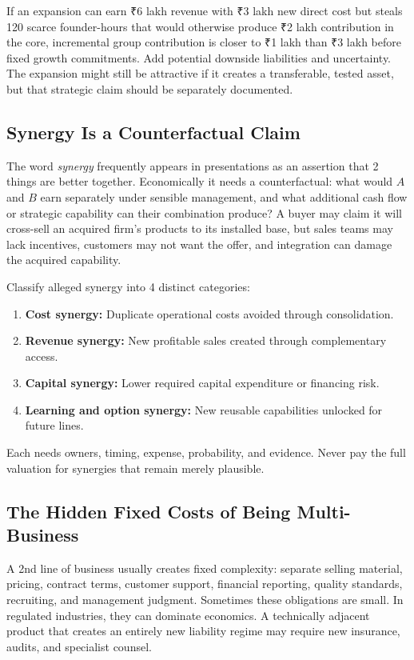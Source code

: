 If an expansion can earn ₹6 lakh revenue with ₹3 lakh new direct cost but steals 120 scarce founder-hours that would otherwise produce ₹2 lakh contribution in the core, incremental group contribution is closer to ₹1 lakh than ₹3 lakh before fixed growth commitments. Add potential downside liabilities and uncertainty. The expansion might still be attractive if it creates a transferable, tested asset, but that strategic claim should be separately documented.

\subsection{Synergy Is a Counterfactual Claim}
\label{sec:synergy_counterfactual_claim}

The word \textit{synergy} frequently appears in presentations as an assertion that 2 things are better together. Economically it needs a counterfactual: what would $A$ and $B$ earn separately under sensible management, and what additional cash flow or strategic capability can their combination produce? A buyer may claim it will cross-sell an acquired firm's products to its installed base, but sales teams may lack incentives, customers may not want the offer, and integration can damage the acquired capability.

Classify alleged synergy into 4 distinct categories:
\begin{enumerate}
    \item \textbf{Cost synergy:} Duplicate operational costs avoided through consolidation.
    \item \textbf{Revenue synergy:} New profitable sales created through complementary access.
    \item \textbf{Capital synergy:} Lower required capital expenditure or financing risk.
    \item \textbf{Learning and option synergy:} New reusable capabilities unlocked for future lines.
\end{enumerate}
Each needs owners, timing, expense, probability, and evidence. Never pay the full valuation for synergies that remain merely plausible.

\subsection{The Hidden Fixed Costs of Being Multi-Business}
\label{sec:hidden_fixed_costs_multibusiness}

A 2nd line of business usually creates fixed complexity: separate selling material, pricing, contract terms, customer support, financial reporting, quality standards, recruiting, and management judgment. Sometimes these obligations are small. In regulated industries, they can dominate economics. A technically adjacent product that creates an entirely new liability regime may require new insurance, audits, and specialist counsel.

